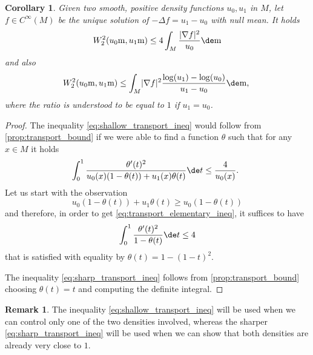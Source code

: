 \documentclass[10pt]{amsart}
\theoremstyle{plain}
\newtheorem{corollary}[corollary]{Corollary}
\theoremstyle{definition}
\newtheorem{remark}[remark]{Remark}
\numberwithin{equation}{section}
\newcommand{\lapl}{\ensuremath{\Delta}}
\renewcommand{\comma}{\ensuremath{\text{, }}}
\newcommand{\comma}{\ensuremath{\text{, }}}
\newcommand{\fullstop}{\ensuremath{\text{. }}}
\newcommand{\m}{\ensuremath{\mathrm m}}
\DeclarePairedDelimiter\abs{\lvert}{\rvert}
\begin{document}
\begin{corollary}
Given two smooth, positive density functions $u_0, u_1$ in $M$, let $f\in C^\infty(M)$
be the unique solution of $-\lapl f = u_1-u_0$ with null mean.
It holds
\begin{equation}\label{eq:shallow_transport_ineq}
W_2^2(u_0\m, u_1\m)\le 4 \int_M \frac{\abs{\nabla f}^2}{u_0}\de\m
\end{equation}
and also
\begin{equation}\label{eq:sharp_transport_ineq}
W_2^2(u_0\m, u_1\m)\le \int_M \abs{\nabla f}^2\frac{\log(u_1)-\log(u_0)}{u_1-u_0}\de\m \comma
\end{equation}
where the ratio is understood to be equal to $1$ if $u_1=u_0$.
\end{corollary}
\begin{proof}
The inequality \cref{eq:shallow_transport_ineq} would follow from \cref{prop:transport_bound}
if we were able to find a function $\theta$ such that for any $x\in M$ it holds
\begin{equation}\label{eq:transport_elementary_ineq}
\int_0^1\frac{\theta'(t)^2}{u_0(x)(1-\theta(t))+u_1(x)\theta(t)}\de t \le \frac{4}{u_0(x)}\fullstop
\end{equation}
Let us start with the observation
\begin{equation*}
u_0(1-\theta(t))+u_1\theta(t) \ge u_0(1-\theta(t))
\end{equation*}
and therefore, in order to get \cref{eq:transport_elementary_ineq}, it suffices to have
\begin{equation*}
\int_0^1\frac{\theta'(t)^2}{1-\theta(t)}\de t \le 4
\end{equation*}
that is satisfied with equality by $\theta(t) = 1-(1-t)^2$.

The inequality \cref{eq:sharp_transport_ineq} follows from \cref{prop:transport_bound}
choosing $\theta(t)=t$ and computing the definite integral.
\end{proof}
\begin{remark}
The inequality \cref{eq:shallow_transport_ineq} will be used when we can control only one
of the two densities involved, whereas the sharper \cref{eq:sharp_transport_ineq} will be used
when we can show that both densities are already very close to $1$.
\end{remark}
\end{document}
